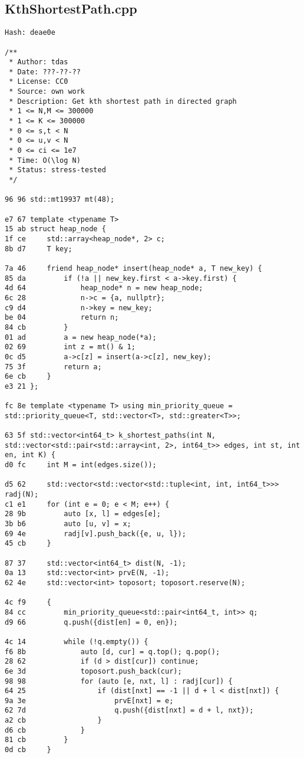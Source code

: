 \documentclass[11pt, a4paper, twoside]{article}
\begin{document}
\subsection{KthShortestPath.cpp}
\begin{lstlisting}
Hash: deae0e

/**
 * Author: tdas
 * Date: ???-??-??
 * License: CC0
 * Source: own work
 * Description: Get kth shortest path in directed graph
 * 1 <= N,M <= 300000
 * 1 <= K <= 300000
 * 0 <= s,t < N
 * 0 <= u,v < N
 * 0 <= ci <= 1e7
 * Time: O(\log N)
 * Status: stress-tested
 */

96 96 std::mt19937 mt(48);

e7 67 template <typename T>
15 ab struct heap_node {
1f ce     std::array<heap_node*, 2> c;
8b d7     T key;
      
7a 46     friend heap_node* insert(heap_node* a, T new_key) {
85 da         if (!a || new_key.first < a->key.first) {
4d 64             heap_node* n = new heap_node;
6c 28             n->c = {a, nullptr};
c9 d4             n->key = new_key;
be 04             return n;
84 cb         }
01 ad         a = new heap_node(*a);
02 69         int z = mt() & 1;
0c d5         a->c[z] = insert(a->c[z], new_key);
75 3f         return a;
6e cb     }
e3 21 };

fc 8e template <typename T> using min_priority_queue = std::priority_queue<T, std::vector<T>, std::greater<T>>;

63 5f std::vector<int64_t> k_shortest_paths(int N, std::vector<std::pair<std::array<int, 2>, int64_t>> edges, int st, int en, int K) {
d0 fc     int M = int(edges.size());
      
d5 62     std::vector<std::vector<std::tuple<int, int, int64_t>>> radj(N);
c1 e1     for (int e = 0; e < M; e++) {
28 9b         auto [x, l] = edges[e];
3b b6         auto [u, v] = x;
69 4e         radj[v].push_back({e, u, l});
45 cb     }
      
87 37     std::vector<int64_t> dist(N, -1);
0a 13     std::vector<int> prvE(N, -1);
62 4e     std::vector<int> toposort; toposort.reserve(N);
      
4c f9     {
84 cc         min_priority_queue<std::pair<int64_t, int>> q;
d9 66         q.push({dist[en] = 0, en});
      
4c 14         while (!q.empty()) {
f6 8b             auto [d, cur] = q.top(); q.pop();
28 62             if (d > dist[cur]) continue;
6e 3d             toposort.push_back(cur);
98 98             for (auto [e, nxt, l] : radj[cur]) {
64 25                 if (dist[nxt] == -1 || d + l < dist[nxt]) {
9a 3e                     prvE[nxt] = e;
62 7d                     q.push({dist[nxt] = d + l, nxt});
a2 cb                 }
d6 cb             }
81 cb         }
0d cb     }
      

\end{lstlisting}
\end{document}
